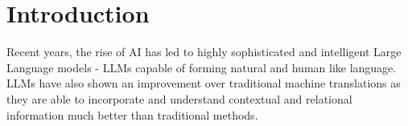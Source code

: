 






\section{Introduction}
    Recent years, the rise of AI has led to highly sophisticated and intelligent Large Language models - LLMs capable of forming natural and human like language. LLMs have also shown an improvement over traditional machine translations as they are able to incorporate and understand contextual and relational information much better than traditional methods.~\cite{gao2024machine}

